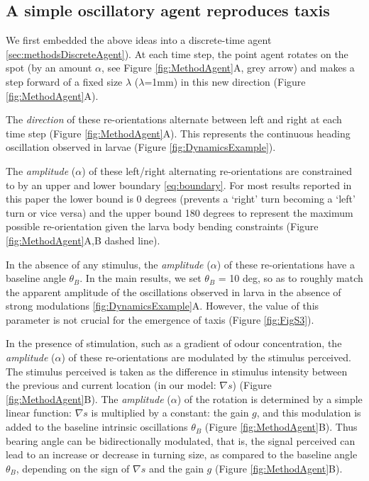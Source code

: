 \documentclass[11pt,a4paper]{article}
\newcommand{\todoBW}[1]{\todo[author=BW,color=orange, size=\tiny,inline]{#1}}
\begin{document}
\subsection{A simple oscillatory agent reproduces taxis}

We first embedded the above ideas into a discrete-time agent \ref{sec:methodsDiscreteAgent}). At each time step, the point agent rotates on the spot (by an amount $\alpha$, see Figure \ref{fig:MethodAgent}A, grey arrow) and makes a step forward of a fixed size $\lambda$ ($\lambda$=1mm) in this new direction (Figure \ref{fig:MethodAgent}A).

The {\it direction} of these re-orientations alternate between left and right at each time step (Figure \ref{fig:MethodAgent}A). This represents the continuous heading oscillation observed in larvae (Figure \ref{fig:DynamicsExample}).  

The {\it amplitude} ($\alpha$) of these left/right alternating re-orientations are constrained to by an upper and lower boundary \eqref{eq:boundary}. For most results reported in this paper the lower bound is 0 degrees (prevents a `right' turn becoming a `left' turn or vice versa) and the upper bound 180 degrees to represent the maximum possible re-orientation given the larva body bending constraints (Figure \ref{fig:MethodAgent}A,B dashed line).

In the absence of any stimulus, the {\it amplitude} ($\alpha$) of these re-orientations have a baseline angle $\theta_{B}$. In the main results, we set $\theta_{B}$ = 10 deg, so as to roughly match the apparent amplitude of the oscillations observed in larva in the absence of strong modulations \ref{fig:DynamicsExample}A. However, the value of this parameter is not crucial for the emergence of taxis (Figure \ref{fig:FigS3}).

In the presence of stimulation, such as a gradient of odour concentration, the {\it amplitude} ($\alpha$) of these re-orientations are modulated by the stimulus perceived. The stimulus perceived is taken as the difference in stimulus intensity between the previous and current location (in our model: $\nabla s$) (Figure \ref{fig:MethodAgent}B). 
The {\it amplitude} ($\alpha$) of the rotation is determined by a simple linear function: $\nabla s$ is multiplied by a constant: the gain $g$, and this modulation is added to the baseline intrinsic oscillations $\theta_{B}$ (Figure \ref{fig:MethodAgent}B). Thus bearing angle can be bidirectionally modulated, that is, the signal perceived can lead to an increase or decrease in turning size, as compared to the baseline angle $\theta_{B}$, depending on the sign of $\nabla s$  and the gain $g$ (Figure \ref{fig:MethodAgent}B).
\end{document}

